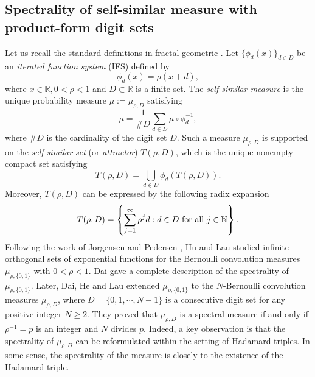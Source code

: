 \documentclass[11pt]{article}
\numberwithin{equation}{section}
\begin{document}
\subsection{Spectrality of self-similar measure with product-form digit sets}
Let us recall the standard definitions  in fractal geometric \cite{Falconer_1990}.
Let $\{\phi_d(x)\}_{d\in D}$ be an {\it iterated function system} (IFS) defined by
	\begin{equation*}\label {eq(1.1)}
		\phi_d(x)=\rho(x+d),
	\end{equation*}
	where $ x\in \mathbb{R}, 0<\rho<1$ and  $D\subset \mathbb{R}$ is a finite set.
	The {\it self-similar measure} is the unique probability measure $\mu:=\mu_{\rho,D}$ satisfying
	\begin{equation}\label{1.1}
		\mu=\frac{1}{\# D}\sum_{d\in D}\mu\circ\phi_d^{-1},
	\end{equation}
	where $\#D$ is the cardinality of the digit set $D$. Such a measure $\mu_{\rho,D}$ is supported on the {\it self-similar set} (or {\it attractor}) $ T(\rho,D)$, which is the unique  nonempty compact set satisfying
	\begin{equation*}
		T(\rho,D)=\bigcup_{d\in D}\phi_d(T(\rho,D)).
	\end{equation*}
	Moreover, $T(\rho,D)$ can be expressed by the following radix expansion
	\begin{align}\label{eqa}
		T(\rho,D)=\left\{\sum_{j=1}^{\infty}\rho^{j}d:d\in D \ {\rm for \ all} \ j\in\mathbb{N}\right\}.
	\end{align}
 Following the work of Jorgensen and Pedersen \cite{Jorgensen-Pedersen_1998}, Hu and Lau \cite{Lau2008} studied infinite orthogonal sets of exponential functions for the Bernoulli convolution measures $\mu_{\rho,\{0,1\}}$ with $0<\rho<1$.
 Dai \cite{Dai2012} gave a complete description of the spectrality of $\mu_{\rho,\{0,1\}}$. Later, Dai, He and Lau extended $\mu_{\rho,\{0,1\}}$ to the $N$-Bernoulli convolution measures $\mu_{\rho,D}$, where $D=\{0, 1, \cdots, N-1\}$ is a consecutive digit set for any positive integer $N\geq 2$. They \cite{Dai-He-Lau_2014}  proved that $\mu_{\rho,D}$ is a spectral measure if and only if $\rho^{-1}=p$ is an integer and $N$ divides $p$.
Indeed, a key observation is that the spectrality of $\mu_{\rho,D}$ can be reformulated within the setting of Hadamard triples. In some sense, the spectrality of the measure is closely to the existence of the Hadamard triple.
\end{document}
